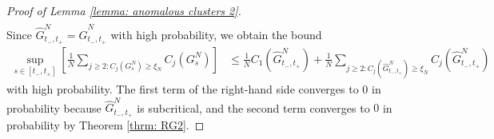 \begin{proof}[Proof of Lemma \ref{lemma: anomalous clusters 2}]
\begin{equation}
\begin{split}
\end{split} \end{equation} Since $\widehat{G}^N_{t_-,t_+}=\widehat{G}^N_{t_-,t_+}$ with high probability, we obtain the bound \begin{equation}\begin{split}
    \sup_{s\in [t_-, t_+]} \left[\frac{1}{N}\sum_{j\geq 2: C_j(G^N_s)\geq \xi_N} C_j(G^N_s)\right] & \leq \frac{1}{N}C_1(\widehat{G}^N_{t_-, t_+})+\frac{1}{N}\sum_{j\geq 2: C_j(\widehat{G}^N_{t_-,t_+})\geq \xi_N} C_j(\widehat{G}^N_{t_-,t_+})
\end{split} \end{equation} with high probability. The first term of the right-hand side converges to $0$ in probability  because $\widehat{G}^N_{t_-,t_+}$ is subcritical, and the second term converges to $0$ in probability by Theorem \ref{thrm: RG2}. \end{proof} 

